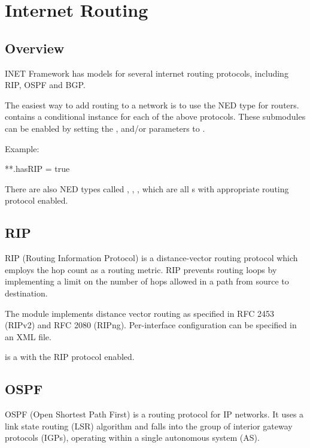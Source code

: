 \chapter{Internet Routing}
\label{cha:routing}

\section{Overview}
\label{sec:routing:overview}

INET Framework has models for several internet routing protocols, including
RIP, OSPF and BGP.

The easiest way to add routing to a network is to use the 
NED type for routers.  contains a conditional instance
for each of the above protocols. These submodules can be enabled by
setting the ,  and/or  parameters to
.

Example:

\begin{inifile}
**.hasRIP = true
\end{inifile}

There are also NED types called , ,
, which are all s with appropriate
routing protocol enabled.

\section{RIP}
\label{sec:routing:rip}

RIP (Routing Information Protocol) is a distance-vector routing protocol
which employs the hop count as a routing metric. RIP prevents routing loops
by implementing a limit on the number of hops allowed in a path from source
to destination.

The  module implements distance vector routing as
specified in RFC 2453 (RIPv2) and RFC 2080 (RIPng). Per-interface
configuration can be specified in an XML file.

 is a  with the RIP protocol enabled.


\section{OSPF}
\label{sec:routing:ospf}

OSPF (Open Shortest Path First) is a routing protocol for IP networks.
It uses a link state routing (LSR) algorithm and falls into the group
of interior gateway protocols (IGPs), operating within a single
autonomous system (AS).

